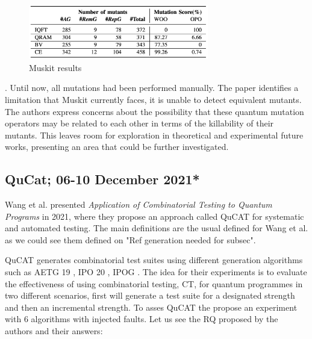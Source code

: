 \begin{itemize}
\begin{figure}[H]
        \centering
        \includegraphics[width=0.7\textwidth]{TFM/photos/MuskitResults.png}
        \caption{Muskit results \cite{mendiluze2021muskit}} 
        \label{Fig:MuskitRes}
\end{figure}

. Until now, all mutations had been performed manually. The paper identifies a limitation that Muskit currently faces, it is unable to detect equivalent mutants. The authors express concerns about the possibility that these quantum mutation operators may be related to each other in terms of the killability of their mutants. This leaves room for exploration in theoretical and experimental future works, presenting an area that could be further investigated.

\vspace{15pt}
\subsection{QuCat; 06-10 December 2021*}

Wang et al. presented \textit{Application of Combinatorial Testing to Quantum Programs} \cite{wang2021application} in 2021, where they propose an approach called QuCAT for systematic and automated testing. The main definitions are the usual defined for Wang et al. as we could see them defined on "Ref generation needed for subsec".\newline

QuCAT generates combinatorial test suites using different generation algorithms such as AETG 19 \cite{cohen1997aetg}, IPO 20 \cite{lei1998parameter}, IPOG \cite{lei2007ipog}. The idea for their experiments is to evaluate the effectiveness of using combinatorial testing, CT, for quantum programmes in two different scenarios, first will generate a test suite for a designated strength and then an incremental strength. To asses QuCAT the propose an experiment with 6 algorithms with injected faults. Let us see the RQ proposed by the authors and their answers:


\end{itemize}
